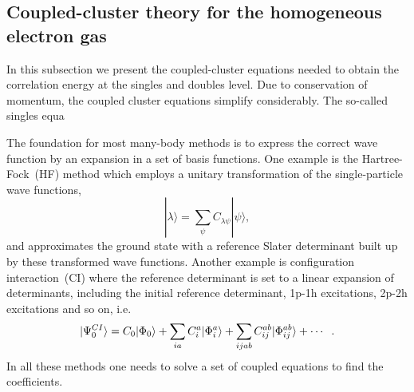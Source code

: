 \documentclass[aps,twocolumn,showpacs,floatfix,nofootinbib,preprintnumbers,superscriptaddress,amsmath,amssymb]{revtex4-1}
\begin{document}
\subsection{Coupled-cluster theory for the homogeneous electron gas}


In this subsection we present the coupled-cluster equations needed to obtain the correlation energy 
at the singles and doubles level. Due to  conservation of momentum, the coupled cluster equations simplify considerably.
The so-called singles equa

The foundation for most many-body methods is to express the correct wave function by an expansion in a set of basis functions. 
One example is the Hartree-Fock~(HF) method which employs a unitary transformation of the single-particle wave functions, 
\begin{equation}
|\lambda \rangle = \sum_{\psi} C_{\lambda \psi} |\psi \rangle ,
\end{equation}
and approximates the ground state with a reference Slater determinant built up by these transformed wave functions.
Another example is configuration interaction~(CI) where the reference determinant is set to a linear expansion of determinants, including the initial reference determinant, 1p-1h excitations, 2p-2h excitations and so on, i.e.
\begin{equation}
|\Psi_{0}^{CI} \rangle = C_0 |\Phi_0 \rangle + \sum_{ia} C_i^a |\Phi_i^a\rangle + \sum_{ijab} C_{ij}^{ab} |\Phi_{ij}^{ab} \rangle + \cdots \hspace{2mm}.
\end{equation}
In all these methods one needs to solve a set of coupled equations to find the coefficients.
\end{document}
